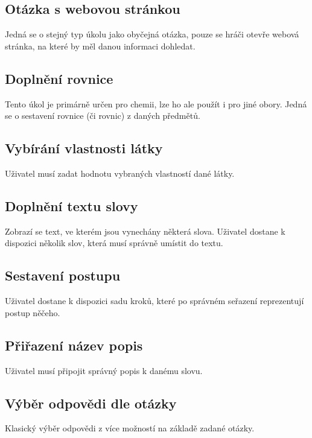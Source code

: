 \documentclass[a4paper,12pt]{article}
\begin{document}
\subsection{Otázka s webovou stránkou}
Jedná se o stejný typ úkolu jako obyčejná otázka, pouze se hráči otevře webová stránka, na které by měl danou informaci dohledat.
\subsection{Doplnění rovnice}
Tento úkol je primárně určen pro chemii, lze ho ale použít i pro jiné obory. Jedná se o sestavení rovnice (či rovnic) z daných předmětů.
\begin{figure}[H]
\end{figure}
\subsection{Vybírání vlastnosti látky}
Uživatel musí zadat hodnotu vybraných vlastností dané látky.
\subsection{Doplnění textu slovy}
Zobrazí se text, ve kterém jsou vynechány některá slova. Uživatel dostane k dispozici několik slov, která musí správně umístit do textu.
\subsection{Sestavení postupu}
Uživatel dostane k dispozici sadu kroků, které po správném seřazení reprezentují postup něčeho.
\subsection{Přiřazení název popis}
Uživatel musí připojit správný popis k danému slovu.
\subsection{Výběr odpovědi dle otázky}
Klasický výběr odpovědi z více možností na základě zadané otázky.
\end{document}
